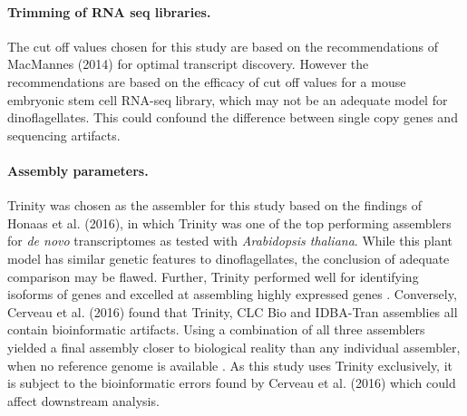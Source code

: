 \documentclass[12pt]{article}
\begin{document}
\paragraph*{Trimming of RNA seq libraries.} The cut off values chosen for this study are based on the recommendations of MacMannes (2014) for optimal transcript discovery. 
However the recommendations are based on the efficacy of cut off values for a mouse embryonic stem cell RNA-seq library, which may not be an adequate model for dinoflagellates. 
This could confound the difference between single copy genes and sequencing artifacts.
\paragraph*{Assembly parameters.}
Trinity was chosen as the assembler for this study based on the findings of Honaas et al. (2016), in which Trinity was one of the top performing assemblers for \textit{de novo} transcriptomes as tested with \textit{Arabidopsis thaliana}. 
While this plant model has similar genetic features to dinoflagellates, the conclusion of adequate comparison may be flawed.
Further, Trinity performed well for identifying isoforms of genes and excelled at assembling highly expressed genes \cite{honaas2016selecting}.
Conversely, Cerveau et al. (2016) found that Trinity, CLC Bio and IDBA-Tran assemblies all contain bioinformatic artifacts. 
Using a combination of all three assemblers yielded a final assembly closer to biological reality than any individual assembler, when no reference genome is available \cite{cerveau2016combining}.
As this study uses Trinity exclusively, it is subject to the bioinformatic errors found by Cerveau et al. (2016) which could affect downstream analysis.
\end{document}
